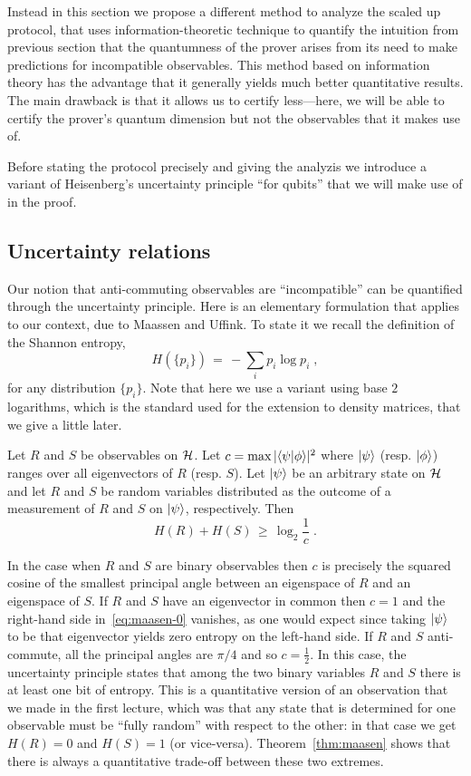 Instead in this section we propose a different method to analyze the scaled up protocol, that uses information-theoretic technique to quantify the intuition from previous section that the quantumness of the prover arises from its need to make predictions for incompatible observables. This method based on information theory has the advantage that it generally yields much better quantitative results. The main drawback is that it allows us to certify less---here, we will be able to certify the prover's quantum dimension but not the observables that it makes use of. 

Before stating the protocol precisely and giving the analyzis we introduce a variant of Heisenberg's uncertainty principle ``for qubits'' that we will make use of in the proof. 

\subsection{Uncertainty relations}

Our notion that anti-commuting observables are ``incompatible'' can be quantified through the uncertainty principle. Here is an elementary formulation that applies to our context, due to Maassen and Uffink. To state it we recall the definition of the Shannon entropy, 
\[H(\{p_i\}) \,=\, -\sum_i p_i\log p_i\;,\]
for any distribution $\{p_i\}$. Note that here we use a variant using base $2$ logarithms, which is the standard used for the extension to density matrices, that we give a little later. 

\begin{theorem}\label{thm:maasen}
Let $R$ and $S$ be observables on $\mathcal{H}$. Let $c = \max | \langle\psi| \phi\rangle|^2$ where $|\psi\rangle$ (resp. $|\phi\rangle$) ranges over all eigenvectors of $R$ (resp. $S$). Let $|\psi\rangle$ be an arbitrary state on $\mathcal{H}$ and let $R$ and $S$ be random variables distributed as the outcome of a measurement of $R$ and $S$ on $|\psi\rangle$, respectively. Then 
\begin{equation}\label{eq:maasen-0}
 H(R) + H(S) \,\geq\, \log_2\frac{1}{c}\;.
\end{equation}
\end{theorem}

In the case when $R$ and $S$ are binary observables then $c$ is precisely the squared cosine of the smallest principal angle between an eigenspace of $R$ and an eigenspace of $S$. If $R$ and $S$ have an eigenvector in common then $c=1$ and the right-hand side in~\eqref{eq:maasen-0} vanishes, as one would expect since taking $|\psi\rangle$ to be that eigenvector yields zero entropy on the left-hand side. 
If $R$ and $S$ anti-commute, all the principal angles are $\pi/4$ and so $c=\frac{1}{2}$. In this case, the uncertainty principle states that among the two binary variables $R$ and $S$ there is at least one bit of entropy. This is a quantitative version of an observation that we made in the first lecture, which was that any state that is determined for one observable must be ``fully random'' with respect to the other: in that case we get $H(R)=0$ and $H(S)=1$ (or vice-versa). Theorem~\ref{thm:maasen} shows that there is always a quantitative trade-off between these two extremes. 

